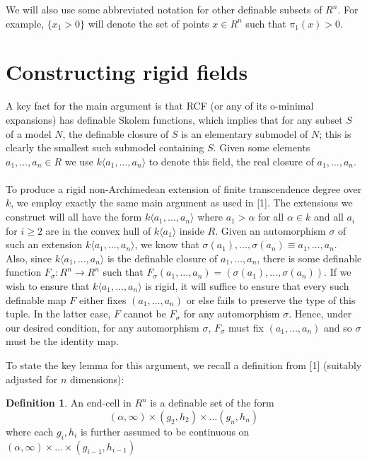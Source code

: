 \documentclass{article}
\theoremstyle{remark}
\theoremstyle{definition}
\newtheorem{definition}[theorem]{Definition}
\theoremstyle{definition}
\theoremstyle{definition}
\theoremstyle{definition}
\begin{document}
We will also use some abbreviated notation for other definable subsets of $R^n$. For example, $\{x_1>0\}$ will denote the set of points $x\in R^n$ such that $\pi_1(x)>0$.

\section{Constructing rigid fields}
A key fact for the main argument is that RCF (or any of its o-minimal expansions) has definable Skolem functions, which implies that for any subset $S$ of a model $N$, the definable closure of $S$ is an elementary submodel of $N$; this is clearly the smallest such submodel containing $S$. Given some elements $a_1,\dots,a_n\in R$ we use $k\langle a_1,\dots,a_n\rangle$ to denote this field, the real closure of $a_1,\dots,a_n$.
\\
\\
To produce a rigid non-Archimedean extension of finite transcendence degree over $k$, we employ exactly the same main argument as used in [1]. The extensions we construct will all have the form $k\langle a_1,\dots, a_n\rangle$ where $a_1>\alpha$ for all $\alpha\in k$ and all $a_i$ for $i\geq 2$ are in the convex hull of $k\langle a_1\rangle$ inside $R$. Given an automorphism $\sigma$ of such an extension $k\langle a_1,\dots, a_n\rangle$, we know that $\sigma(a_1),\dots,\sigma(a_n)\equiv a_1,\dots, a_n$. Also, since $k\langle a_1,\dots, a_n\rangle$ is the definable closure of $a_1,\dots,a_n$, there is some definable function $F_\sigma:R^n\to R^n$ such that $F_\sigma(a_1,\dots,a_n)=(\sigma(a_1),\dots,\sigma(a_n))$. If we wish to ensure that $k\langle a_1,\dots, a_n\rangle$ is rigid, it will suffice to ensure that every such definable map $F$ either fixes $(a_1,\dots,a_n)$ or else fails to preserve the type of this tuple. In the latter case, $F$ cannot be $F_\sigma$ for any automorphism $\sigma$. Hence, under our desired condition, for any automorphism $\sigma$, $F_\sigma$ must fix $(a_1,\dots,a_n)$ and so $\sigma$ must be the identity map.

To state the key lemma for this argument, we recall a definition from [1] (suitably adjusted for $n$ dimensions):
\begin{definition}
    An end-cell in $R^n$ is a definable set of the form 
    \[(\alpha,\infty)\times(g_2,h_2)\times\dots( g_n,h_n)\]
    where each $g_i,h_i$ is further assumed to be continuous on $(\alpha,\infty)\times\dots\times(g_{i-1},h_{i-1})$
\end{definition}
\end{document}
